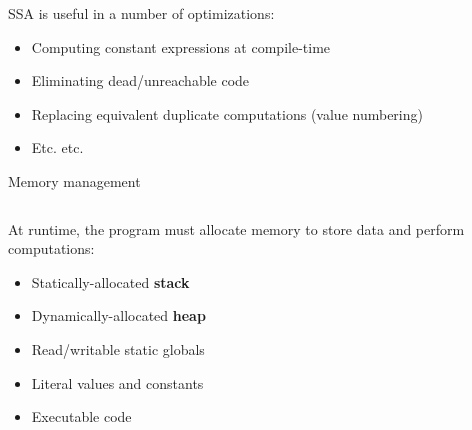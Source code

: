 \documentclass[../index.tex]{subfiles}
\begin{document}
\begin{frame}[fragile]{\currenttitle}
  SSA is useful in a number of optimizations:

  \begin{itemize}
    \item Computing constant expressions at compile-time
    \item Eliminating dead/unreachable code
    \item Replacing equivalent duplicate computations (value numbering)
    \item Etc. etc.
  \end{itemize}
\end{frame}

\renewcommand{\currenttitle}{Memory management}
\begin{frame}[fragile]{\currenttitle}
  \begin{columns}
    \begin{column}{0.6\textwidth}
      At runtime, the program must allocate memory to store data and perform
      computations:
      \begin{itemize}
        \item Statically-allocated \textbf{stack}
        \item Dynamically-allocated \textbf{heap}
        \item Read/writable static globals
        \item Literal values and constants
        \item Executable code
      \end{itemize}
    \end{column}

    \begin{column}{0.3\textwidth}
      \newcommand{\sectionn}[6]{%
        \node (#2) [
          section,
          below=0 of #3,
          minimum height=#4,
          preaction={fill, #5},
          #6
        ] {#1};%
      }
      \newcommand{\datasectionn}[3]{%
        \sectionn{#1}{#2}{#3}{5.7mm}{black!20}{font=\footnotesize}
        \draw [--, draw=black!50] (#2.north west) -- (#2.north east);%
      }

\end{column}
\end{columns}
\end{frame}
\end{document}
